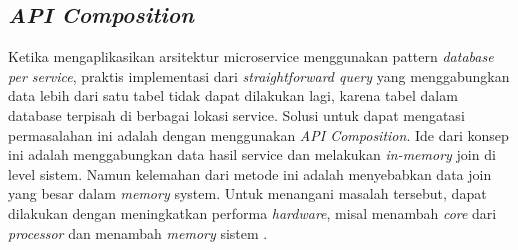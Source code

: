\subsection{\textit{API Composition}}
Ketika mengaplikasikan arsitektur microservice menggunakan pattern \textit{database per service}, praktis implementasi dari \textit{straightforward query} yang menggabungkan data lebih dari satu tabel tidak dapat dilakukan lagi, karena tabel dalam database terpisah di berbagai lokasi service. Solusi untuk dapat mengatasi permasalahan ini adalah dengan menggunakan \textit{API Composition}. Ide dari konsep ini adalah menggabungkan data hasil service dan melakukan \textit{in-memory} join di level sistem. Namun kelemahan dari metode ini adalah menyebabkan data join yang besar dalam \textit{memory} system. Untuk menangani masalah tersebut, dapat dilakukan dengan meningkatkan performa \textit{hardware}, misal menambah \textit{core} dari \textit{processor} dan menambah \textit{memory} sistem \cite{6}.

\begin{adjustbox}{width=1\textwidth}
	\centering
	\begin{minipage}{\linewidth}
	\end{minipage}
\end{adjustbox}
